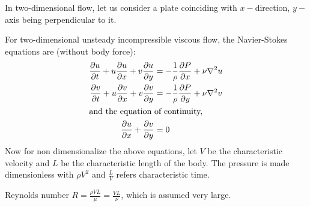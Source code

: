 \documentclass[../main-sheet.tex]{subfiles}
\begin{document}
\begin{soln}
    In two-dimensional flow, let us consider a plate coinciding with \(x-\)direction, \(y-\)axis being perpendicular to it.

    For two-dimensional unsteady incompressible viscous flow, the Navier-Stokes equations are (without body force):
    \begin{align}
        \frac{\partial u}{\partial t }+u\frac{\partial u}{\partial x }+v\frac{\partial u}{\partial y }&=-\frac{1}{\rho}\frac{\partial P}{\partial x }+\nu \nabla^2 u \label{eq:prand1}\\
        \frac{\partial v}{\partial t }+u\frac{\partial v}{\partial x }+v\frac{\partial v}{\partial y }&=-\frac{1}{\rho}\frac{\partial P}{\partial y }+\nu \nabla^2 v \label{eq:prand2}\\
        \intertext{and the equation of continuity,}
        \frac{\partial u}{\partial x }+\frac{\partial v}{\partial y }&=0 \label{eq:prand3}
    \end{align}
    Now for non dimensionalize the above equations, let \(V \) be the characteristic velocity and \(L \) be the characteristic length of the body. The pressure is made dimensionless with \(\rho V^2\) and \(\frac{L }{V }\) refers characteristic time.
    
    Reynolds number \(R=\frac{\rho V L }{\mu}=\frac{VL }{\nu}\), which is assumed very large.
    

\end{soln}
\end{document}

